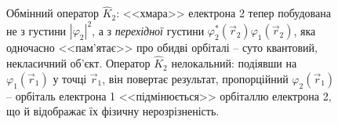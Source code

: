 \documentclass[]{article}
\begin{document}
\begin{figure}[h!]
\centering
{}
\caption{Обмінний оператор $\hat K_2$: <<хмара>> електрона 2 тепер побудована не з густини $|\varphi_2|^2$, а з \emph{перехідної} густини $\varphi_2^*(\vec r_2)\varphi_1(\vec r_2)$, яка одночасно <<пам'ятає>> про обидві орбіталі -- суто квантовий, некласичний об'єкт. Оператор $\hat K_2$ нелокальний: подіявши на $\varphi_1(\vec r_1)$ у точці $\vec r_1$, він повертає результат, пропорційний $\varphi_2(\vec r_1)$ -- орбіталь електрона 1 <<підмінюється>> орбіталлю електрона 2, що й відображає їх фізичну нерозрізненість.}
\label{fig:exchange-operator}
\end{figure}
\end{document}
